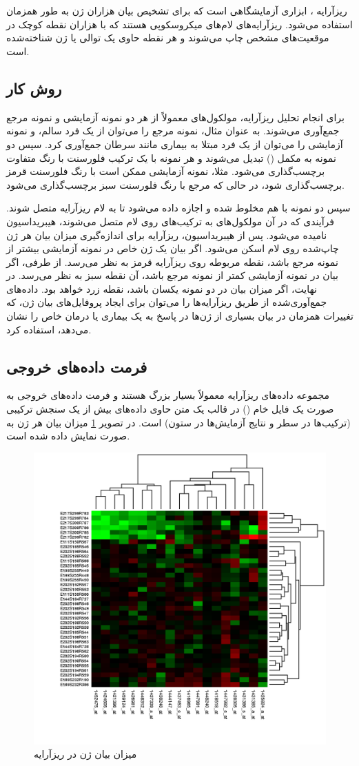 \documentclass{article}
\begin{document}
\section{}
ریزآرایه ، ابزاری آزمایشگاهی است که برای تشخیص بیان هزاران ژن به طور همزمان استفاده می‌شود. ریزآرایه‌های  لام‌های میکروسکوپی هستند که با هزاران نقطه کوچک در موقعیت‌های مشخص چاپ می‌شوند و هر نقطه حاوی یک توالی  یا ژن شناخته‌شده است.

 \subsection*{روش کار}
برای انجام تحلیل ریزآرایه، مولکول‌های  معمولاً از هر دو نمونه آزمایشی و نمونه مرجع جمع‌آوری می‌شوند. به عنوان مثال، نمونه مرجع را می‌توان از یک فرد سالم، و نمونه آزمایشی را می‌توان از یک فرد مبتلا به بیماری مانند سرطان جمع‌آوری کرد. سپس دو نمونه  به  مکمل () تبدیل می‌شوند و هر نمونه با یک ترکیب فلورسنت  با رنگ متفاوت برچسب‌گذاری می‌شود. مثلا، نمونه آزمایشی  ممکن است با رنگ فلورسنت قرمز برچسب‌گذاری شود، در حالی که  مرجع با رنگ فلورسنت سبز برچسب‌گذاری می‌شود.

 سپس دو نمونه با هم مخلوط شده و اجازه داده می‌شود تا به لام ریزآرایه متصل شوند. فرآیندی که در آن مولکول‌های  به ترکیب‌های  روی لام متصل می‌شوند، هیبریداسیون  نامیده می‌شود.
پس از هیبریداسیون، ریزآرایه برای اندازه‌گیری میزان بیان هر ژن چاپ‌شده روی لام اسکن می‌شود. اگر بیان یک ژن خاص در نمونه آزمایشی بیشتر از نمونه مرجع باشد، نقطه مربوطه روی ریزآرایه قرمز به نظر می‌رسد.
از طرفی، اگر بیان در نمونه آزمایشی کمتر از نمونه مرجع باشد، آن نقطه سبز به نظر می‌رسد. در نهایت، اگر میزان بیان در دو نمونه یکسان باشد، نقطه زرد خواهد بود. داده‌های جمع‌آوری‌شده از طریق ریزآرایه‌ها را می‌توان برای ایجاد پروفایل‌های بیان ژن، که تغییرات همزمان در بیان بسیاری از ژن‌ها در پاسخ به یک بیماری یا درمان خاص را نشان می‌دهد، استفاده کرد. \cite{nature-microarray}
 
 \subsection*{فرمت داده‌‌های خروجی}
مجموعه داده‌های ریزآرایه معمولاً بسیار بزرگ هستند و فرمت داده‌های خروجی به صورت یک فایل خام () در قالب یک متن  حاوی داده‌های بیش از یک سنجش ترکیبی (ترکیب‌ها در سطر‌ و نتایج آزمایش‌ها در ستون) است.
در تصویر \ref{fig:microarray} میزان بیان هر ژن به صورت  نمایش داده شده است.
\begin{figure}[h!]
	\centering
	\includegraphics[width=0.3\columnwidth]{figs/microarray.png}
	\caption{میزان بیان ژن در ریزآرایه \cite{wiki-microarray}}
	\label{fig:microarray}
\end{figure}
\end{document}
